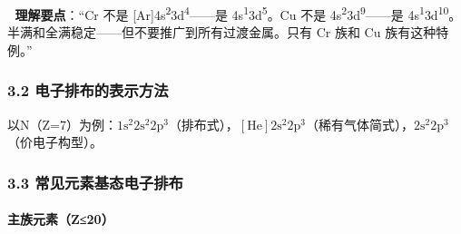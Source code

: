 \documentclass[a4paper,11pt]{ctexart}
\begin{document}
📌 \textbf{理解要点}：``Cr 不是 {[}Ar{]}4s\textsuperscript{2}3d\textsuperscript{4}------是 4s\textsuperscript{1}3d\textsuperscript{5}。Cu 不是 4s\textsuperscript{2}3d\textsuperscript{9}------是 4s\textsuperscript{1}3d\textsuperscript{10}。半满和全满稳定------但不要推广到所有过渡金属。只有 Cr 族和 Cu 族有这种特例。''

\subsubsection{3.2 电子排布的表示方法}\label{ux7535ux5b50ux6392ux5e03ux7684ux8868ux793aux65b9ux6cd5}

以N（Z=7）为例：\(1\mathrm{s}^2 2\mathrm{s}^2 2\mathrm{p}^3\)（排布式），\([\mathrm{He}] 2\mathrm{s}^2 2\mathrm{p}^3\)（稀有气体简式），\(2\mathrm{s}^2 2\mathrm{p}^3\)（价电子构型）。

\subsubsection{3.3 常见元素基态电子排布}\label{ux5e38ux89c1ux5143ux7d20ux57faux6001ux7535ux5b50ux6392ux5e03}

\paragraph{主族元素（Z≤20）}\label{ux4e3bux65cfux5143ux7d20z20}
\end{document}
